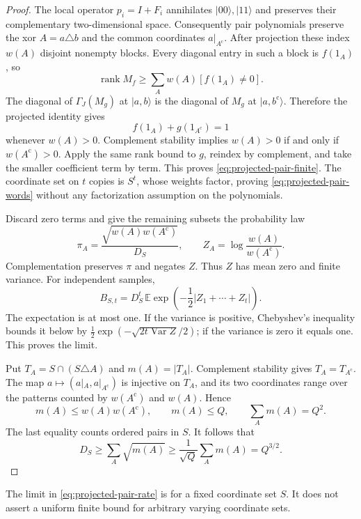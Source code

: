 \begin{proof}
The local operator \(p_i=I+F_i\) annihilates \(|00\rangle,|11\rangle\)
and preserves their complementary two-dimensional space.
Consequently pair polynomials preserve the xor \(A=a\triangle b\)
and the common coordinates \(a|_{A^{\mathrm c}}\). After projection
these index \(w(A)\) disjoint nonempty blocks. Every diagonal entry
in such a block is \(f(1_A)\), so
\[
 \operatorname{rank}M_f
 \geq\sum_Aw(A)[f(1_A)\ne0].
\]
The diagonal of \(\Gamma_J(M_g)\) at \(|a,b\rangle\) is the diagonal
of \(M_g\) at \(|a,b^{\mathrm c}\rangle\). Therefore the projected
identity gives
\[
 f(1_A)+g(1_{A^{\mathrm c}})=1
\]
whenever \(w(A)>0\). Complement stability implies
\(w(A)>0\) if and only if \(w(A^{\mathrm c})>0\).
Apply the same rank bound to \(g\), reindex by complement, and take
the smaller coefficient term by term. This proves
\eqref{eq:projected-pair-finite}. The coordinate set on \(t\) copies is
\(S^t\), whose weights factor, proving
\eqref{eq:projected-pair-words} without any factorization assumption
on the polynomials.

Discard zero terms and give the remaining subsets the probability law
\[
 \pi_A=\frac{\sqrt{w(A)w(A^{\mathrm c})}}{D_S},
 \qquad Z_A=\log\frac{w(A)}{w(A^{\mathrm c})}.
\]
Complementation preserves \(\pi\) and negates \(Z\). Thus \(Z\)
has mean zero and finite variance. For independent samples,
\[
 B_{S,t}=D_S^t\,
   \mathbb E\exp\left(-\frac12|Z_1+\cdots+Z_t|\right).
\]
The expectation is at most one. If the variance is positive,
Chebyshev's inequality bounds it below by
\(\frac12\exp(-\sqrt{2t\operatorname{Var}Z}/2)\);
if the variance is zero it equals one. This proves the limit.

Put \(T_A=S\cap(S\triangle A)\) and \(m(A)=|T_A|\).
Complement stability gives \(T_A=T_{A^{\mathrm c}}\).
The map \(a\mapsto(a|_A,a|_{A^{\mathrm c}})\) is injective on \(T_A\),
and its two coordinates range over the patterns counted by
\(w(A^{\mathrm c})\) and \(w(A)\). Hence
\[
 m(A)\leq w(A)w(A^{\mathrm c}),\qquad
 m(A)\leq Q,\qquad \sum_A m(A)=Q^2.
\]
The last equality counts ordered pairs in \(S\). It follows that
\[
 D_S\geq\sum_A\sqrt{m(A)}
       \geq\frac1{\sqrt Q}\sum_A m(A)=Q^{3/2}.
\]
\end{proof}

The limit in \eqref{eq:projected-pair-rate} is for a fixed coordinate
set \(S\). It does not assert a uniform finite bound for arbitrary
varying coordinate sets.

